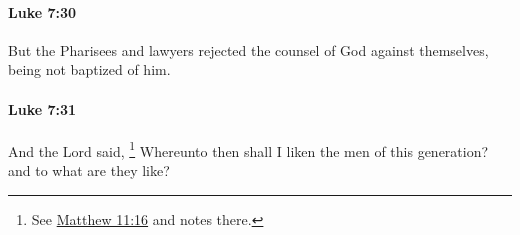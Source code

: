 		\paragraph{Luke 7:30} %
			\label{LUKE-7-30}

			But the Pharisees and lawyers rejected the counsel of God against themselves, being not baptized of him.

			\begin{framed}
			\scriptsize
				\begin{compactdesc}
					\item[SBLG] 
				\end{compactdesc}
			\end{framed}

		\paragraph{Luke 7:31} %
			\label{LUKE-7-31}

			And the Lord said,
				\footnote{%
					See \hyperref[MATTHEW-11-16]{Matthew 11:16} and notes there.
					}%
			Whereunto then shall I liken the men of this generation? and to what are they like?

